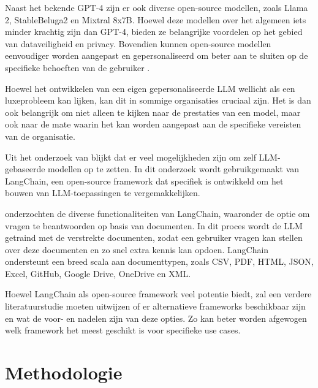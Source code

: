 Naast het bekende GPT-4 zijn er ook diverse open-source modellen, zoals Llama 2, StableBeluga2 en Mixtral 8x7B. Hoewel deze modellen over het algemeen iets minder krachtig zijn dan GPT-4, bieden ze belangrijke voordelen op het gebied van dataveiligheid en privacy. Bovendien kunnen open-source modellen eenvoudiger worden aangepast en gepersonaliseerd om beter aan te sluiten op de specifieke behoeften van de gebruiker \autocite{KernanFreire2024}.

Hoewel het ontwikkelen van een eigen gepersonaliseerde LLM wellicht als een luxeprobleem kan lijken, kan dit in sommige organisaties cruciaal zijn. Het is dan ook belangrijk om niet alleen te kijken naar de prestaties van een model, maar ook naar de mate waarin het kan worden aangepast aan de specifieke vereisten van de organisatie.

Uit het onderzoek van \textcite{Topsakal2023} blijkt dat er veel mogelijkheden zijn om zelf LLM-gebaseerde modellen op te zetten. In dit onderzoek wordt gebruikgemaakt van LangChain, een open-source framework dat specifiek is ontwikkeld om het bouwen van LLM-toepassingen te vergemakkelijken.

\textcite{Topsakal2023} onderzochten de diverse functionaliteiten van LangChain, waaronder de optie om vragen te beantwoorden op basis van documenten. In dit proces wordt de LLM getraind met de verstrekte documenten, zodat een gebruiker vragen kan stellen over deze documenten en zo snel extra kennis kan opdoen. LangChain ondersteunt een breed scala aan documenttypen, zoals CSV, PDF, HTML, JSON, Excel, GitHub, Google Drive, OneDrive en XML.

Hoewel LangChain als open-source framework veel potentie biedt, zal een verdere literatuurstudie moeten uitwijzen of er alternatieve frameworks beschikbaar zijn en wat de voor- en nadelen zijn van deze opties. Zo kan beter worden afgewogen welk framework het meest geschikt is voor specifieke use cases.


\section{Methodologie}%
\label{sec:methodologie}

